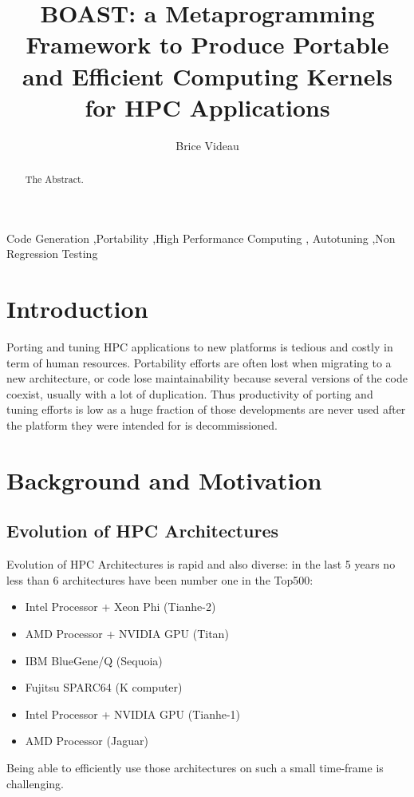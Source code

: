 \documentclass[review]{elsarticle}
\begin{document}
\begin{frontmatter}

\title{BOAST: a Metaprogramming Framework to Produce Portable and Efficient Computing Kernels for HPC Applications}

\author[mymainaddress]{Brice Videau}

\address[mymainaddress]{LIG/CNRS}

\begin{abstract}
The Abstract.
\end{abstract}

\begin{keyword}
Code Generation \sep Portability \sep High Performance Computing \sep
Autotuning \sep Non Regression Testing
\end{keyword}

\end{frontmatter}

\linenumbers

\section{Introduction}

Porting and tuning HPC applications to new platforms is tedious and costly
in term of human resources. Portability efforts are often lost when
migrating to a new architecture, or code lose maintainability because
several versions of the code coexist, usually with a lot of duplication.
Thus productivity of porting and tuning efforts is low as a huge fraction
of those developments are never used after the platform they were intended
for is decommissioned.

\section{Background and Motivation}

  \subsection{Evolution of HPC Architectures}

Evolution of HPC Architectures is rapid and also diverse: in the last 5
years no less than 6 architectures have been number one in the Top500:
\begin{itemize}
\item Intel Processor + Xeon Phi (Tianhe-2)
\item AMD Processor + NVIDIA GPU (Titan)
\item IBM BlueGene/Q (Sequoia)
\item Fujitsu SPARC64 (K computer)
\item Intel Processor + NVIDIA GPU (Tianhe-1)
\item AMD Processor (Jaguar)
\end{itemize}
Being able to efficiently use those architectures on such a small
time-frame is challenging.
\end{document}

